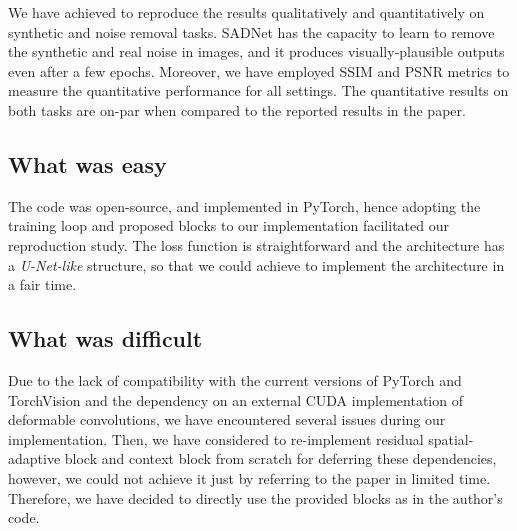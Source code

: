 We have achieved to reproduce the results qualitatively and quantitatively on synthetic and noise removal tasks. SADNet has the capacity to learn to remove the synthetic and real noise in images, and it produces visually-plausible outputs even after a few epochs. Moreover, we have employed SSIM and PSNR metrics to measure the quantitative performance for all settings. The quantitative results on both tasks are on-par when compared to the reported results in the paper.

\subsection*{What was easy}

 The code was open-source, and implemented in PyTorch, hence adopting the training loop and proposed blocks to our implementation facilitated our reproduction study. The loss function is straightforward and the architecture has a \textit{U-Net-like} structure, so that we could achieve to implement the architecture in a fair time. 


\subsection*{What was difficult}

Due to the lack of compatibility with the current versions of PyTorch and TorchVision and the dependency on an external CUDA implementation of deformable convolutions, we have encountered several issues during our implementation. Then, we have considered to re-implement residual spatial-adaptive block and context block from scratch for deferring these dependencies, however, we could not achieve it just by referring to the paper in limited time. Therefore, we have decided to directly use the provided blocks as in the author's code.


